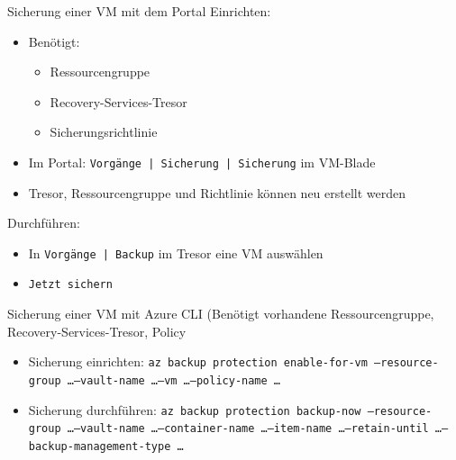 \begin{flashcard}[Definition]{Sicherung einer VM mit dem Portal}
    Einrichten:
    \begin{itemize}
        \item Benötigt:
            \begin{itemize}
                \item Ressourcengruppe
                \item Recovery-Services-Tresor
                \item Sicherungsrichtlinie
            \end{itemize}
        \item Im Portal:\newline
            \texttt{Vorgänge | Sicherung | Sicherung} im VM-Blade
        \item Tresor, Ressourcengruppe und Richtlinie können neu erstellt werden
    \end{itemize}
    Durchführen:
    \begin{itemize}
        \item In \texttt{Vorgänge | Backup} im Tresor eine VM auswählen
        \item \texttt{Jetzt sichern}
    \end{itemize}

\end{flashcard}

\begin{flashcard}[Definition]{Sicherung einer VM mit Azure CLI}
    (Benötigt vorhandene Ressourcengruppe, Recovery-Services-Tresor, Policy
    \begin{itemize}
        \item Sicherung einrichten:\newline
            \texttt{az backup protection enable-for-vm --resource-group \ldots --vault-name \ldots --vm \ldots --policy-name \ldots}
        \item Sicherung durchführen:\newline
            \texttt{az backup protection backup-now --resource-group \ldots --vault-name \ldots --container-name \ldots --item-name \ldots --retain-until \ldots --backup-management-type \ldots}
    \end{itemize}
\end{flashcard}

